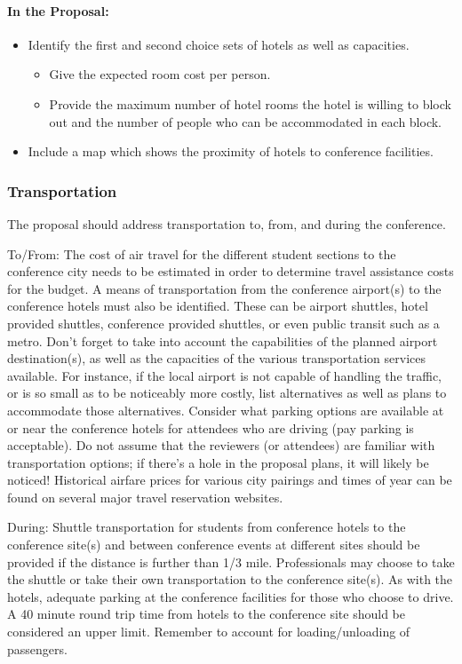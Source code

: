 \documentclass[12pt]{article}
\begin{document}
\paragraph{In the Proposal:}
\begin{itemize}
\item{Identify the first and second choice sets of hotels as well as capacities.
\begin{itemize}
\item{Give the expected room cost per person.}
\item{Provide the maximum number of hotel rooms the hotel is willing to block out
and the number of people who can be accommodated in each block.}
\end{itemize}
}

\item{Include a map which shows the proximity of hotels to conference facilities.}
\end{itemize}

\subsubsection{Transportation}

The proposal should address transportation to, from, and during the conference.

To/From: The cost of air travel for the different student sections to the conference city
needs to be estimated in order to determine travel assistance costs for the budget. A
means of transportation from the conference airport(s) to the conference hotels must also
be identified. These can be airport shuttles, hotel provided shuttles, conference provided
shuttles, or even public transit such as a metro. Don't forget to take into account the capabilities of the planned airport destination(s), as well as the capacities of the various transportation services available. For instance, if the local airport is not capable of handling the traffic, or is so small as to be noticeably more costly, list alternatives as well as plans to accommodate those alternatives. 
Consider what parking options are available at or near the conference hotels for attendees who are driving (pay parking is acceptable). 
Do not assume that the reviewers (or attendees) are familiar with transportation options; if there's a hole in the proposal plans, it will likely be noticed!
Historical airfare prices for various city pairings and times of year can be found
on several major travel reservation websites.

During: Shuttle transportation for students from conference hotels to the conference
site(s) and between conference events at different sites should be provided if the distance is further than 1/3 mile. Professionals may choose to take the shuttle or take their own transportation to the conference site(s). As with the hotels, adequate parking at the conference facilities for those who choose to drive.
A 40 minute round trip time from hotels to the conference site should be
considered an upper limit. Remember to account for loading/unloading of passengers.
\end{document}
